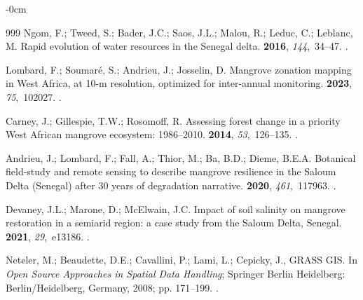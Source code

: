 \documentclass[earth,article,accept,pdftex,moreauthors]{Definitions/mdpi}
\begin{document}
{\begin{adjustwidth}{-\extralength}{0cm}
\begin{thebibliography}{999}
Ngom, F.; Tweed, S.; Bader, J.C.; Saos, J.L.; Malou, R.; Leduc, C.; Leblanc, M.
\newblock Rapid evolution of water resources in the Senegal delta.
 {\bf 2016}, {\em 144},~34--47.
.

Lombard, F.; Soumaré, S.; Andrieu, J.; Josselin, D.
\newblock Mangrove zonation mapping in West Africa, at 10-m resolution,
  optimized for inter-annual monitoring.
 {\bf 2023}, {\em 75},~102027.
.

Carney, J.; Gillespie, T.W.; Rosomoff, R.
\newblock Assessing forest change in a priority West African mangrove
  ecosystem: 1986–2010.
 {\bf 2014}, {\em 53},~126--135.
.

Andrieu, J.; Lombard, F.; Fall, A.; Thior, M.; Ba, B.D.; Dieme, B.E.A.
\newblock Botanical field-study and remote sensing to describe mangrove
  resilience in the Saloum Delta (Senegal) after 30 years of degradation
  narrative. %
 {\bf 2020}, {\em 461},~117963.
.

Devaney, J.L.; Marone, D.; McElwain, J.C.
\newblock Impact of soil salinity on mangrove restoration in a semiarid region:
  a case study from the Saloum Delta, Senegal.
 {\bf 2021}, {\em 29},~e13186.
.

Neteler, M.; Beaudette, D.E.; Cavallini, P.; Lami, L.; Cepicky, J., GRASS GIS.
\newblock In {\em Open Source Approaches in Spatial Data Handling}; Springer
  Berlin Heidelberg: Berlin/Heidelberg, Germany, 2008; pp. 171--199.
.


\end{thebibliography}
\end{adjustwidth}}
\end{document}
